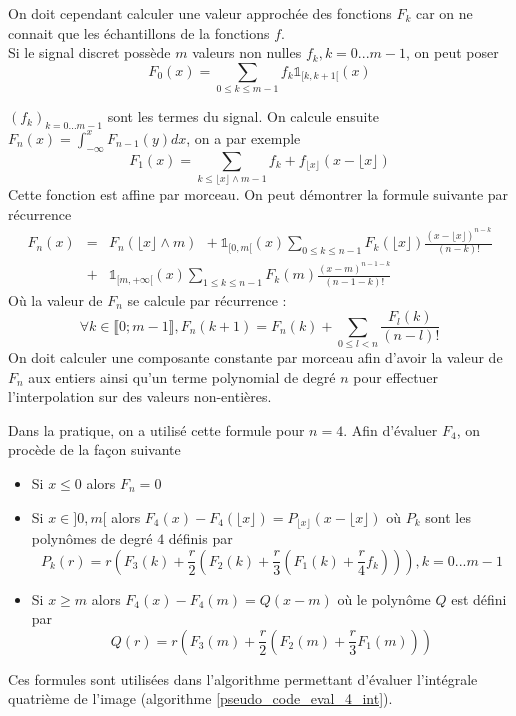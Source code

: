 On doit cependant calculer une valeur approchée des fonctions $F_{k}$  car on ne connait que les échantillons de la fonctions $f$.\\
Si le signal discret possède $m$ valeurs non nulles $f_k,k=0...m-1$, on peut poser 
\begin{equation*}
F_{0} (x) =\underset{0\le k \le m-1}{\sum}f_{k} \mathds{1}_{[k,k+1[}(x)
\end{equation*}

$(f_k)_{k=0...m-1}$ sont les termes du signal. On calcule ensuite $F_{n}(x)=\int_{-\infty}^{x}F_{n-1}(y)dx$, on a par exemple
\begin{equation*}
F_{1}(x)=\underset{k\le \lfloor x\rfloor \wedge m-1}{\sum}f_{k}+ f_{\lfloor x\rfloor}
(x-\lfloor x\rfloor)
\end{equation*}
Cette fonction est affine par morceau. On peut démontrer la formule suivante par récurrence
\begin{eqnarray*}
F_{n}(x) &=& F_{n}(\lfloor x\rfloor \wedge m)~~+\mathds{1}_{[0,m[}(x) \underset{0\le k \le n-1}{\sum}F_{k}(\lfloor x \rfloor) \frac{(x-\lfloor x \rfloor)^{n-k}}{(n-k)!}\\
          &+&\mathds{1}_{[m,+\infty[}(x)\underset{1\le k \le n-1}{\sum}F_{k}(m) \frac{(x-m)^{n-1-k}}{(n-1-k)!}
\end{eqnarray*}
Où la valeur de $F_{n}$ se calcule par récurrence :
\begin{equation*}
\forall k \in \llbracket 0 ;m-1 \rrbracket, F_{n}(k+1)=F_{n}(k)+\underset{0\le l < n}{\sum} \frac{F_{l}(k)}{(n-l)!}
\end{equation*}
On doit calculer une composante constante par morceau afin d'avoir la valeur de $F_{n}$ aux entiers ainsi qu'un terme polynomial de degré $n$ pour effectuer l'interpolation sur des valeurs non-entières.

Dans la pratique, on a utilisé cette formule pour $n=4$. Afin d'évaluer $F_4$, on procède de la façon suivante 
\begin{itemize}
\item Si $x\le 0$ alors $F_{n}=0$
\item Si $x\in ]0 , m[$ alors $F_{4}(x)-F_{4}(\lfloor x \rfloor)=P_{\lfloor x \rfloor}(x-\lfloor x \rfloor)$ où $P_k$ sont les polynômes de degré $4$ définis par
\begin{equation*}
P_k (r) =r \left( F_{3}(k) +\frac{r}{2} \left(F_{2}(k)+ \frac{r}{3}\left(F_{1}(k)+\frac{r}{4} f_{k}\right)\right)\right), k=0...m-1
\end{equation*}
\item Si $x\ge m$ alors $F_{4}(x)-F_{4}(m)=Q(x-m)$ où le polynôme $Q$ est défini par
\begin{equation*}
Q(r)=r \left(F_{3}(m)+\frac{r}{2} \left( F_{2}(m) + \frac{r}{3} F_1 (m)\right)\right)
\end{equation*}

\end{itemize}
Ces formules sont utilisées dans l'algorithme permettant d'évaluer l'intégrale quatrième de l'image (algorithme \ref{pseudo_code_eval_4_int}).

